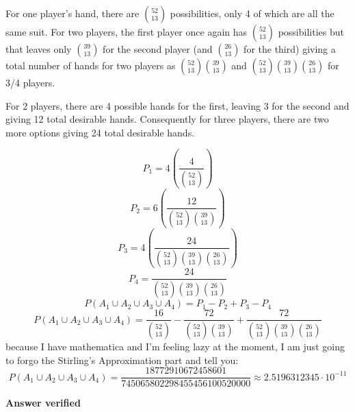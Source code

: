 For one player's hand, there are $\binom{52}{13}$ possibilities, only 4 of which are all the same suit.  For two players, the first player once again has $\binom{52}{13}$ possibilities but that leaves only $\binom{39}{13}$ for the second player (and $\binom{26}{13}$ for the third) giving a total number of hands for two players as $\binom{52}{13}\binom{39}{13}$ and $\binom{52}{13}\binom{39}{13}\binom{26}{13}$ for 3/4 players.

For 2 players, there are 4 possible hands for the first, leaving 3 for the second and giving 12 total desirable hands.  Consequently for three players, there are two more options giving 24 total desirable hands.


\begin{equation}
	P_1 =  4\left(\frac{4}{\binom{52}{13}}\right)
\end{equation}
\begin{equation}
	P_2 = 6\left( \frac{12}{\binom{52}{13}\binom{39}{13}} \right)
\end{equation} 
\begin{equation}
	P_3 = 4\left( \frac{24}{\binom{52}{13}\binom{39}{13}\binom{26}{13}} \right)
\end{equation}
\begin{equation}
	P_4 = \frac{24}{\binom{52}{13}\binom{39}{13}\binom{26}{13}}
\end{equation}
\begin{equation}
	P\left(A_1 \cup A_2 \cup A_3 \cup A_4\right) = P_1 - P_2 +P_3 - P_4
\end{equation}
\begin{equation}
	P\left(A_1 \cup A_2 \cup A_3 \cup A_4\right) = \frac{16}{\binom{52}{13}} - \frac{72}{\binom{52}{13}\binom{39}{13}} + \frac{72}{\binom{52}{13}\binom{39}{13}\binom{26}{13}}
\label{answer2.16}
\end{equation}
because I have mathematica and I'm feeling lazy at the moment, I am just going to forgo the Stirling's Approximation part and tell you:
\begin{equation}
	P\left(A_1 \cup A_2 \cup A_3 \cup A_4\right) = \frac{18772910672458601}{745065802298455456100520000} \approx 2.5196312345 \cdot 10^{-11}
\end{equation}


\textbf{Answer verified}

\subsection{}

